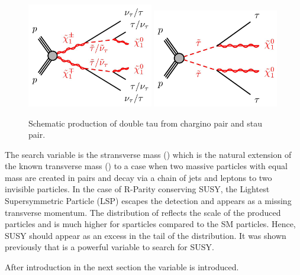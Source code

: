 \begin{figure}[!htb]
\centering
\includegraphics[width=0.49\textwidth]{Introductionfigs/DiChargino.png}
\includegraphics[width=0.49\textwidth]{Introductionfigs/DiSTau.png}
\caption{Schematic production of double tau from chargino pair and stau pair.}
\label{fig:Productions}
\end{figure}


The search variable is the stransverse mass (\mttwo) which is the natural extension of the known transverse mass (\mt) to a case 
when two massive particles with equal mass are created in pairs and decay via a chain of jets and leptons to two 
invisible particles. 
In the case of R-Parity conserving SUSY, the Lightest Supersymmetric Particle (LSP) escapes the detection and appears as 
a missing transverse momentum.
The distribution of \mttwo reflects the scale of the produced particles and is much higher for sparticles
compared to the SM particles. Hence, SUSY should appear as an excess in the tail of the \mttwo distribution.
It was shown previously \cite{MT2_2011} that \mttwo is a powerful variable to search for SUSY. 


After introduction in the next section the \mttwo variable is introduced. 




